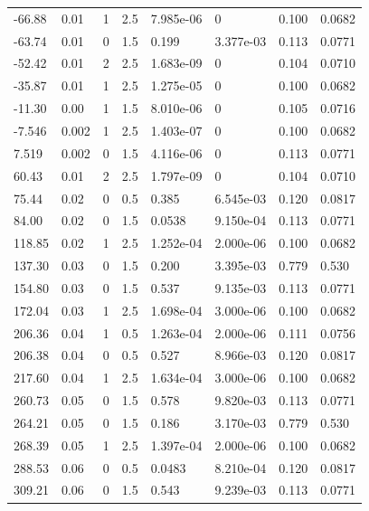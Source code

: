 \documentclass[preview]{standalone}
\begin{document}
{{\begin{tabular}{L{1.2cm}C{1.2cm} C{0.3cm}C{0.5cm} C{1.4cm}C{1.4cm} C{1.4cm}C{1.4cm}}
  -66.88  &  0.01  & 1     & 2.5 &  7.985e-06  & 0  & 0.100 &  0.0682   \\ 
  -63.74  &  0.01  & 0     & 1.5 &  0.199  & 3.377e-03  & 0.113 &  0.0771   \\ 
  -52.42  &  0.01  & 2     & 2.5 &  1.683e-09  & 0  & 0.104 &  0.0710   \\ 
  -35.87  &  0.01  & 1     & 2.5 &  1.275e-05  & 0  & 0.100 &  0.0682   \\ 
  -11.30  &  0.00  & 1     & 1.5 &  8.010e-06  & 0  & 0.105 &  0.0716   \\ 
  -7.546  &  0.002  & 1     & 2.5 &  1.403e-07  & 0  & 0.100 &  0.0682   \\ 
  7.519  &  0.002  & 0     & 1.5 &  4.116e-06  & 0  & 0.113 &  0.0771   \\ 
  60.43  &  0.01  & 2     & 2.5 &  1.797e-09  & 0  & 0.104 &  0.0710   \\ 
  75.44  &  0.02  & 0     & 0.5 &  0.385  & 6.545e-03  & 0.120 &  0.0817   \\ 
  84.00  &  0.02  & 0     & 1.5 &  0.0538  & 9.150e-04  & 0.113 &  0.0771   \\ 
  118.85  &  0.02  & 1     & 2.5 &  1.252e-04  & 2.000e-06  & 0.100 &  0.0682   \\ 
  137.30  &  0.03  & 0     & 1.5 &  0.200  & 3.395e-03  & 0.779 &  0.530   \\ 
  154.80  &  0.03  & 0     & 1.5 &  0.537  & 9.135e-03  & 0.113 &  0.0771   \\ 
  172.04  &  0.03  & 1     & 2.5 &  1.698e-04  & 3.000e-06  & 0.100 &  0.0682   \\ 
  206.36  &  0.04  & 1     & 0.5 &  1.263e-04  & 2.000e-06  & 0.111 &  0.0756   \\ 
  206.38  &  0.04  & 0     & 0.5 &  0.527  & 8.966e-03  & 0.120 &  0.0817   \\ 
  217.60  &  0.04  & 1     & 2.5 &  1.634e-04  & 3.000e-06  & 0.100 &  0.0682   \\ 
  260.73  &  0.05  & 0     & 1.5 &  0.578  & 9.820e-03  & 0.113 &  0.0771   \\ 
  264.21  &  0.05  & 0     & 1.5 &  0.186  & 3.170e-03  & 0.779 &  0.530   \\ 
  268.39  &  0.05  & 1     & 2.5 &  1.397e-04  & 2.000e-06  & 0.100 &  0.0682   \\ 
  288.53  &  0.06  & 0     & 0.5 &  0.0483  & 8.210e-04  & 0.120 &  0.0817   \\ 
  309.21  &  0.06  & 0     & 1.5 &  0.543  & 9.239e-03  & 0.113 &  0.0771   \\ 

\end{tabular}}}
\end{document}
